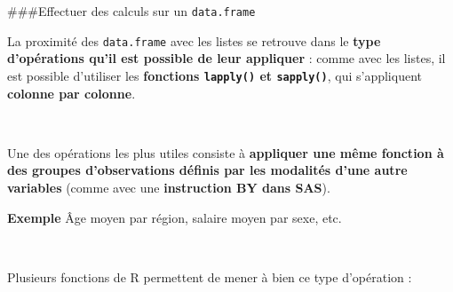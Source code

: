 \documentclass[12pt,twosided, notitlepage]{book}
\newenvironment{Shaded}{}{}
\newcommand{\CommentTok}[1]{\textcolor[rgb]{0.00,0.50,0.00}{#1}}
\newcommand{\DataTypeTok}[1]{#1}
\newcommand{\DecValTok}[1]{#1}
\newcommand{\KeywordTok}[1]{\textcolor[rgb]{0.00,0.00,1.00}{#1}}
\newcommand{\NormalTok}[1]{#1}
\newcommand{\OperatorTok}[1]{#1}
\newcommand{\StringTok}[1]{\textcolor[rgb]{0.00,0.50,0.50}{#1}}
\renewenvironment{Shaded}{\begin{snugshade}}{\end{snugshade}}
\begin{document}
\#\#\#Effectuer des calculs sur un \texttt{data.frame}

La proximité des \texttt{data.frame} avec les listes se retrouve dans le
\textbf{type d'opérations qu'il est possible de leur appliquer} : comme
avec les listes, il est possible d'utiliser les \textbf{fonctions
\texttt{lapply()} et
\texttt{sapply()}}, qui
s'appliquent \textbf{colonne par colonne}.

\begin{Shaded}
\end{Shaded}

~

Une des opérations les plus utiles consiste à \textbf{appliquer une même
fonction à des groupes d'observations définis par les modalités d'une
autre variables} (comme avec une \textbf{instruction BY dans SAS}).

\textbf{Exemple} Âge moyen par région, salaire moyen par sexe, etc.

~

Plusieurs fonctions de R permettent de mener à bien ce type d'opération
:
\end{document}
